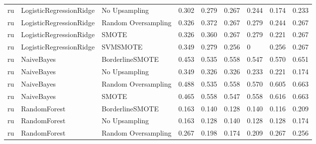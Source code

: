 \begin{tabular}{lllllllll}
      ru &      LogisticRegressionRidge &       No Upsampling & 0.302 &                     0.279 &                 0.267 &                  0.244 &                                   0.174 &     0.233 \\
      ru &      LogisticRegressionRidge & Random Oversampling & 0.326 &                     0.372 &                 0.267 &                  0.279 &                                   0.244 &     0.267 \\
      ru &      LogisticRegressionRidge &               SMOTE & 0.326 &                     0.360 &                 0.267 &                  0.279 &                                   0.221 &     0.267 \\
      ru &      LogisticRegressionRidge &            SVMSMOTE & 0.349 &                     0.279 &                 0.256 &                      0 &                                   0.256 &     0.267 \\
      ru &                   NaiveBayes &     BorderlineSMOTE & 0.453 &                     0.535 &                 0.558 &                  0.547 &                                   0.570 &     0.651 \\
      ru &                   NaiveBayes &       No Upsampling & 0.349 &                     0.326 &                 0.326 &                  0.233 &                                   0.221 &     0.174 \\
      ru &                   NaiveBayes & Random Oversampling & 0.488 &                     0.535 &                 0.558 &                  0.570 &                                   0.605 &     0.663 \\
      ru &                   NaiveBayes &               SMOTE & 0.465 &                     0.558 &                 0.547 &                  0.558 &                                   0.616 &     0.663 \\
      ru &                 RandomForest &     BorderlineSMOTE & 0.163 &                     0.140 &                 0.128 &                  0.140 &                                   0.116 &     0.209 \\
      ru &                 RandomForest &       No Upsampling & 0.163 &                     0.128 &                 0.140 &                  0.128 &                                   0.128 &     0.174 \\
      ru &                 RandomForest & Random Oversampling & 0.267 &                     0.198 &                 0.174 &                  0.209 &                                   0.267 &     0.256 \\

\end{tabular}
